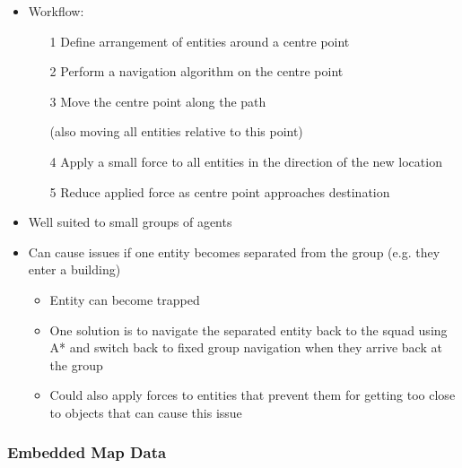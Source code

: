 \documentclass[a4paper]{article}
\begin{document}
\begin{itemize}
  \item
    Workflow:
    \begin{enumerate}
      \item[1]
        Define arrangement of entities around a centre point

      \item[2]
        Perform a navigation algorithm on the centre point

      \item[3]
        Move the centre point along the path

        (also moving all entities relative to this point)

      \item[4]
        Apply a small force to all entities in the direction of the new location

      \item[5]
        Reduce applied force as centre point approaches destination

    \end{enumerate}

  \item
    Well suited to small groups of agents

  \item
    Can cause issues if one entity becomes separated from the group (e.g. they
    enter a building)
    \begin{itemize}
      \item
        Entity can become trapped

      \item
        One solution is to navigate the separated entity back to the squad using
        A* and switch back to fixed group navigation when they arrive back at
        the group

      \item
        Could also apply forces to entities that prevent them for getting too
        close to objects that can cause this issue

    \end{itemize}

\end{itemize}

\subsubsection{Embedded Map Data}
\end{document}

